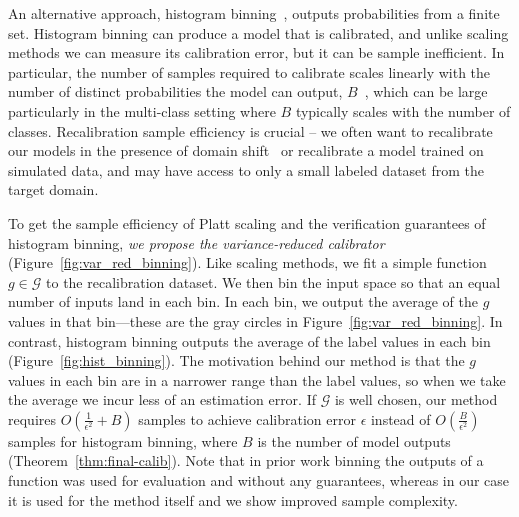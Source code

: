 An alternative approach, histogram binning~\cite{zadrozny2001calibrated}, outputs probabilities from a finite set.
Histogram binning can produce a model that is calibrated, and unlike scaling methods we can measure its calibration error, but it can be  sample inefficient.
In particular, the number of samples required to calibrate scales linearly with the number of distinct probabilities the model can output, $B$~\cite{naeini2014binary}, which can be large particularly in the multi-class  setting where $B$ typically scales with the number of classes.
Recalibration sample efficiency is crucial -- \pl{---} we often want to recalibrate our models in the presence of domain shift~\cite{hendrycks2019anomaly} or recalibrate a model trained on simulated data, and may have access to only a small labeled dataset from the target domain.

To get the sample efficiency of Platt scaling and the verification guarantees of histogram binning, \emph{we propose the variance-reduced calibrator} (Figure~\ref{fig:var_red_binning}).
Like scaling methods, we fit a simple function $g \in \mathcal{G}$ to the recalibration dataset.
We then bin the input space so that an equal number of inputs land in each bin.
In each bin, we output the average of the $g$ values in that bin---these are the gray circles in Figure~\ref{fig:var_red_binning}.
In contrast, histogram binning outputs the average of the label values in each bin (Figure~\ref{fig:hist_binning}).
The motivation behind our method is that the $g$ values in each bin are in a narrower range than the label values, so when we take the average we incur less of an estimation error.
If $\mathcal{G}$ is well chosen, our method requires $O(\frac{1}{\epsilon^2} + B)$ samples to achieve calibration error $\epsilon$ instead of $O(\frac{B}{\epsilon^2})$ samples for histogram binning, where $B$ is the number of model outputs (Theorem~\ref{thm:final-calib}). Note that in prior work\pl{,} binning the outputs of a function was used for evaluation and without any guarantees, whereas in our case it is used for the method itself and we show improved sample complexity.

